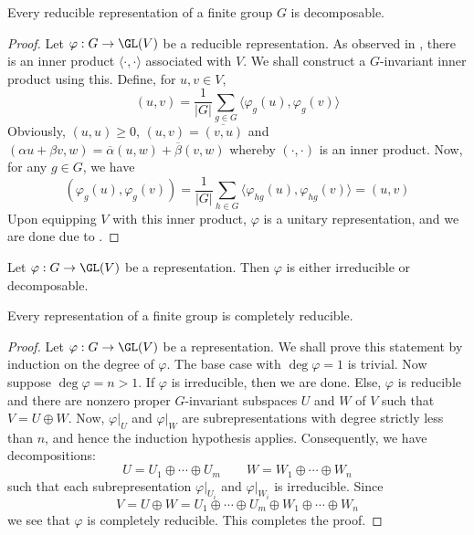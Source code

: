 \begin{proposition}
    Every reducible representation of a finite group $G$ is decomposable.
\end{proposition}
\begin{proof}
    Let $\varphi: G\to\GL(V)$ be a reducible representation. As observed in , there is an inner product $\langle\cdot,\cdot\rangle$ associated with $V$. We shall construct a $G$-invariant inner product using this. Define, for $u,v\in V$,
    \begin{equation*}
        (u,v) = \frac{1}{|G|}\sum_{g\in G}\langle\varphi_g(u),\varphi_g(v)\rangle
    \end{equation*}
    Obviously, $(u,u)\ge 0$, $(u,v) = \overline{(v,u)}$ and $(\alpha u + \beta v, w) = \overline\alpha(u, w) + \overline\beta(v, w)$ whereby $(\cdot,\cdot)$ is an inner product. Now, for any $g\in G$, we have 
    \begin{equation*}
        (\varphi_g(u),\varphi_g(v)) = \frac{1}{|G|}\sum_{h\in G}\langle\varphi_{hg}(u),\varphi_{hg}(v)\rangle = (u,v)
    \end{equation*}
    Upon equipping $V$ with this inner product, $\varphi$ is a unitary representation, and we are done due to .
\end{proof}

\begin{corollary}
    Let $\varphi: G\to\GL(V)$ be a representation. Then $\varphi$ is either irreducible or decomposable.
\end{corollary}

\begin{theorem}[Maschke]
    Every representation of a finite group is completely reducible.
\end{theorem}
\begin{proof}
    Let $\varphi: G\to\GL(V)$ be a representation. We shall prove this statement by induction on the degree of $\varphi$. The base case with $\deg\varphi = 1$ is trivial. Now suppose $\deg\varphi = n > 1$. If $\varphi$ is irreducible, then we are done. Else, $\varphi$ is reducible and there are nonzero proper $G$-invariant subspaces $U$ and $W$ of $V$ such that $V = U\oplus W$. Now, $\varphi|_U$ and $\varphi|_W$ are subrepresentations with degree strictly less than $n$, and hence the induction hypothesis applies. Consequently, we have decompositions: 
    \begin{equation*}
        U = U_1\oplus\cdots\oplus U_m\qquad W = W_1\oplus\cdots\oplus W_n
    \end{equation*}
    such that each subrepresentation $\varphi|_{U_i}$ and $\varphi|_{W_i}$ is irreducible. Since 
    \begin{equation*}
        V = U\oplus W = U_1\oplus\cdots\oplus U_m\oplus W_1\oplus\cdots\oplus W_n
    \end{equation*}
    we see that $\varphi$ is completely reducible. This completes the proof.
\end{proof}

